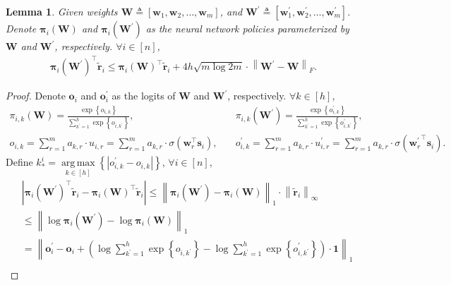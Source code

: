 \documentclass[10pt]{article}
\def\rvo{{\mathbf{o}}}
\def\rvs{{\mathbf{s}}}
\def\rvw{{\mathbf{w}}}
\def\rvo{{\mathbf{o}}}
\def\rvone{{\mathbf{1}}}
\def\rvtilder{{\tilde{\mathbf{r}}}}
\newtheorem{lem}{Lemma}
\def\rvpi{{\boldsymbol{\pi}}}
\def\rmW{{\mathbf{W}}}
\DeclareMathOperator*{\argmax}{arg\,max}
\begin{document}
\begin{lem}
    Given weights $\rmW \triangleq \left[ \rvw_1, \rvw_2, \dots, \rvw_m \right]$, and $\rmW^\prime \triangleq \left[ \rvw_1^\prime, \rvw_2^\prime, \dots, \rvw_m^\prime \right]$. Denote $\rvpi_i\left( \rmW \right)$ and $\rvpi_i\left( \rmW^\prime \right)$ as the neural network policies parameterized by $\rmW$ and $\rmW^\prime$, respectively. $\forall i \in [n]$,
\begin{equation*}
\begin{split}
    \rvpi_i\left( \rmW^\prime \right)^\top \rvtilder_i \le \rvpi_i\left( \rmW \right)^\top \rvtilder_i + 4 h  \sqrt{m \log{2m}} \cdot \left\| \rmW^\prime - \rmW \right\|_F.
\end{split}
\end{equation*}
\end{lem}
\begin{proof}
    Denote $\rvo_i$ and $\rvo_i^\prime$ as the logits of $\rmW$ and $\rmW^\prime$, respectively. $\forall k \in [h]$,
\begin{equation*}
\begin{split}
    \pi_{i,k}\left( \rmW \right) = \frac{\exp\left\{ o_{i,k} \right\}}{\sum\limits_{k^\prime=1}^{h}{ \exp\left\{ o_{i,k^\prime} \right\} }}, &\quad \pi_{i,k}\left( \rmW^\prime \right) = \frac{\exp\left\{ o_{i,k}^\prime \right\}}{\sum\limits_{k^\prime=1}^{h}{ \exp\left\{ o_{i,k^\prime}^\prime \right\} }}, \\
    o_{i,k} = \sum\limits_{r=1}^{m}{a_{k,r} \cdot u_{i,r}} = \sum\limits_{r=1}^{m}{a_{k,r} \cdot \sigma\left( \rvw_r^\top \rvs_i \right)}, &\quad o_{i,k}^\prime = \sum\limits_{r=1}^{m}{a_{k,r} \cdot u_{i,r}^\prime} = \sum\limits_{r=1}^{m}{a_{k,r} \cdot \sigma\left( {\rvw_r^\prime}^\top \rvs_i \right)}.
\end{split}
\end{equation*}
Define $k_*^i = \argmax\limits_{k \in [h]}\left\{ \left| o_{i,k}^\prime - o_{i,k} \right| \right\}$, $\forall i \in [n]$,
\begin{equation*}
\begin{split}
    &\left| \rvpi_i\left( \rmW^\prime \right)^\top \rvtilder_i - \rvpi_i\left( \rmW \right)^\top \rvtilder_i \right| \le \left\| \rvpi_i\left( \rmW^\prime \right) - \rvpi_i\left( \rmW \right) \right\|_1 \cdot \left\| \rvtilder_i \right\|_\infty \\
    &\le \left\| \log{ \rvpi_i\left( \rmW^\prime \right)} - \log{ \rvpi_i\left( \rmW \right) }  \right\|_1 \\
    &= \left\| \rvo_i^\prime - \rvo_i + \left( \log{ \sum\limits_{k^\prime=1}^{h}{ \exp\left\{ o_{i,k^\prime} \right\} } } - \log{ \sum\limits_{k^\prime=1}^{h}{ \exp\left\{ o_{i,k^\prime}^\prime \right\} } } \right) \cdot \rvone\right\|_1 \\

\end{split}
\end{equation*}
\end{proof}
\end{document}
